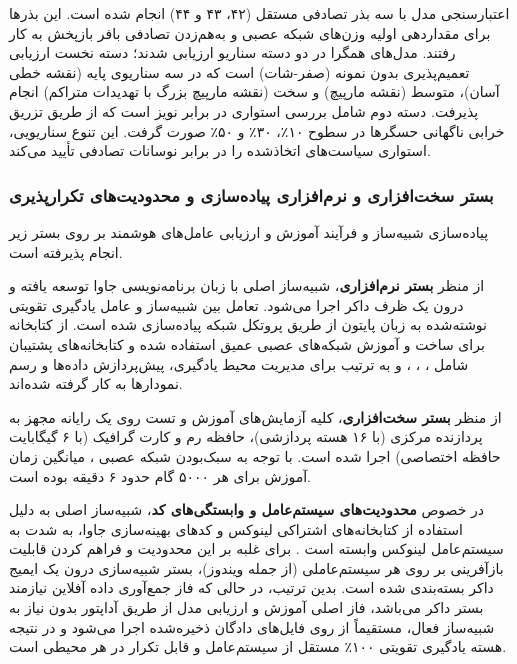 \documentclass[oneside,openany,a4paper,12pt]{article}
\begin{document}
اعتبارسنجی مدل با سه بذر تصادفی مستقل (۴۲، ۴۳ و ۴۴) انجام شده است. این بذرها برای مقداردهی اولیه وزن‌های شبکه عصبی و به‌هم‌زدن تصادفی بافر بازپخش به کار رفتند. مدل‌های همگرا در دو دسته سناریو ارزیابی شدند؛ دسته نخست ارزیابی تعمیم‌پذیری بدون نمونه (صفر-شات) است که در سه سناریوی پایه (نقشه خطی آسان)، متوسط (نقشه مارپیچ) و سخت (نقشه مارپیچ بزرگ با تهدیدات متراکم) انجام پذیرفت. دسته دوم شامل بررسی استواری در برابر نویز است که از طریق تزریق خرابی ناگهانی حسگرها در سطوح ۱۰٪، ۳۰٪ و ۵۰٪ صورت گرفت. این تنوع سناریویی، استواری سیاست‌های اتخاذشده را در برابر نوسانات تصادفی تأیید می‌کند.

\subsubsection{بستر سخت‌افزاری و نرم‌افزاری پیاده‌سازی و محدودیت‌های تکرارپذیری}
پیاده‌سازی شبیه‌ساز  و فرآیند آموزش و ارزیابی عامل‌های هوشمند بر روی بستر زیر انجام پذیرفته است.

از منظر \textbf{بستر نرم‌افزاری}، شبیه‌ساز اصلی با زبان برنامه‌نویسی جاوا  توسعه یافته و درون یک ظرف داکر  اجرا می‌شود. تعامل بین شبیه‌ساز و عامل یادگیری تقویتی نوشته‌شده به زبان پایتون  از طریق پروتکل شبکه  پیاده‌سازی شده است. از کتابخانه  برای ساخت و آموزش شبکه‌های عصبی عمیق استفاده شده و کتابخانه‌های پشتیبان شامل ، ، ،  و  به ترتیب برای مدیریت محیط یادگیری، پیش‌پردازش داده‌ها و رسم نمودارها به کار گرفته شده‌اند.

از منظر \textbf{بستر سخت‌افزاری}، کلیه آزمایش‌های آموزش و تست روی یک رایانه مجهز به پردازنده مرکزی  (با ۱۶ هسته پردازشی)، حافظه رم  و کارت گرافیک  (با ۶ گیگابایت حافظه اختصاصی) اجرا شده است. با توجه به سبک‌بودن شبکه عصبی ، میانگین زمان آموزش برای هر ۵۰۰۰ گام حدود ۶ دقیقه بوده است.

در خصوص \textbf{محدودیت‌های سیستم‌عامل و وابستگی‌های کد}، شبیه‌ساز اصلی  به دلیل استفاده از کتابخانه‌های اشتراکی لینوکس  و کدهای بهینه‌سازی جاوا، به شدت به سیستم‌عامل لینوکس وابسته است . برای غلبه بر این محدودیت و فراهم کردن قابلیت بازآفرینی بر روی هر سیستم‌عاملی (از جمله ویندوز)، بستر شبیه‌سازی درون یک ایمیج داکر  بسته‌بندی شده است. بدین ترتیب، در حالی که فاز جمع‌آوری داده آفلاین نیازمند بستر داکر می‌باشد، فاز اصلی آموزش و ارزیابی مدل از طریق آداپتور  بدون نیاز به شبیه‌ساز فعال، مستقیماً از روی فایل‌های دادگان  ذخیره‌شده اجرا می‌شود و در نتیجه هسته یادگیری تقویتی ۱۰۰٪ مستقل از سیستم‌عامل و قابل تکرار در هر محیطی است.
\end{document}
